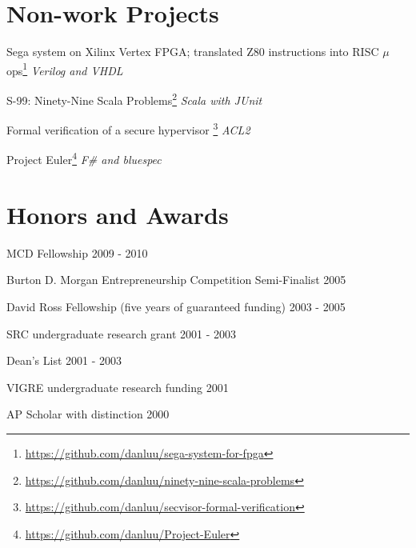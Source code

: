 \documentclass[letterpaper]{scrartcl}
\begin{document}
\section*{Non-work Projects}
\begin{list1}
	\item
	\begin{list2}
		\item Sega system on Xilinx Vertex FPGA; translated Z80 instructions into RISC $\mu$ops\footnote{\href{https://github.com/danluu/sega-system-for-fpga}{https://github.com/danluu/sega-system-for-fpga}}  \hfill \emph{Verilog and VHDL}
		\item S-99: Ninety-Nine Scala Problems\footnote{\href{https://github.com/danluu/ninety-nine-scala-problems}
{https://github.com/danluu/ninety-nine-scala-problems}} \hfill \emph{Scala with JUnit}
		\item Formal verification of a secure hypervisor \footnote{\href{https://github.com/danluu/secvisor-formal-verification}{https://github.com/danluu/secvisor-formal-verification}} \hfill \emph{ACL2}
		\item Project Euler\footnote{\href{https://github.com/danluu/Project-Euler}{https://github.com/danluu/Project-Euler}} \hfill \emph{F\# and bluespec}


	\end{list2}
\end{list1}


%
%
\section*{Honors and Awards}
\begin{list1}
	\item
	\begin{list2}
		\item MCD Fellowship \hfill 2009 - 2010
		\item Burton D. Morgan Entrepreneurship Competition Semi-Finalist \hfill 2005
		\item David Ross Fellowship (five years of guaranteed funding) \hfill 2003 - 2005
		\item SRC undergraduate research grant \hfill 2001 - 2003
		\item Dean's List \hfill 2001 - 2003
		\item VIGRE undergraduate research funding \hfill 2001
		\item AP Scholar with distinction \hfill 2000
	\end{list2}
\end{list1}
\end{document}
